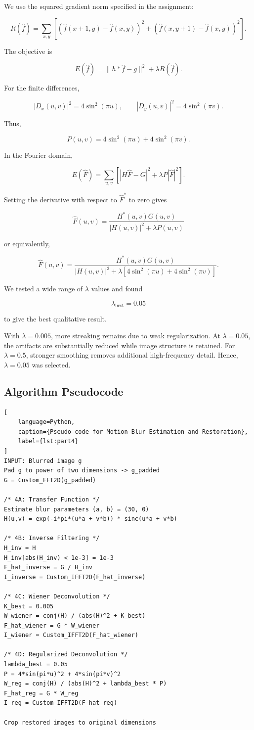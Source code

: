 \documentclass[11pt,a4paper]{article}
\begin{document}
We use the squared gradient norm specified in the assignment:

\[
R(\hat f)
=
\sum_{x,y}
\left[
(\hat f(x+1,y)-\hat f(x,y))^2+
(\hat f(x,y+1)-\hat f(x,y))^2
\right].
\]

The objective is

\[
E(\hat f)=\|h*\hat f-g\|^2+\lambda R(\hat f).
\]

For the finite differences,

\[
|D_x(u,v)|^2=4\sin^2(\pi u),
\qquad
|D_y(u,v)|^2=4\sin^2(\pi v).
\]

Thus,

\[
P(u,v)
=
4\sin^2(\pi u)+4\sin^2(\pi v).
\]

In the Fourier domain,

\[
E(\hat F)
=
\sum_{u,v}
\left[
|H\hat F-G|^2+
\lambda P|\hat F|^2
\right].
\]

Setting the derivative with respect to $\hat F^*$ to zero gives

\[
\boxed{
\hat F(u,v)
=
\frac{H^*(u,v)G(u,v)}
{|H(u,v)|^2+\lambda P(u,v)}
}
\]

or equivalently,

\[
\boxed{
\hat F(u,v)
=
\frac{H^*(u,v)G(u,v)}
{|H(u,v)|^2+
\lambda\left[
4\sin^2(\pi u)+4\sin^2(\pi v)
\right]}.
}
\]

We tested a wide range of $\lambda$ values and found

\[
\boxed{\lambda_{\mathrm{best}}=0.05}
\]

to give the best qualitative result.



With $\lambda=0.005$, more streaking remains due to weak regularization. At $\lambda=0.05$, the artifacts are substantially reduced while image structure is retained. For $\lambda=0.5$, stronger smoothing removes additional high-frequency detail. Hence, $\lambda=0.05$ was selected.

\subsection{Algorithm Pseudocode}
\begin{lstlisting}[
    language=Python,
    caption={Pseudo-code for Motion Blur Estimation and Restoration},
    label={lst:part4}
]
INPUT: Blurred image g
Pad g to power of two dimensions -> g_padded
G = Custom_FFT2D(g_padded)

/* 4A: Transfer Function */
Estimate blur parameters (a, b) = (30, 0)
H(u,v) = exp(-i*pi*(u*a + v*b)) * sinc(u*a + v*b)

/* 4B: Inverse Filtering */
H_inv = H
H_inv[abs(H_inv) < 1e-3] = 1e-3
F_hat_inverse = G / H_inv
I_inverse = Custom_IFFT2D(F_hat_inverse)

/* 4C: Wiener Deconvolution */
K_best = 0.005
W_wiener = conj(H) / (abs(H)^2 + K_best)
F_hat_wiener = G * W_wiener
I_wiener = Custom_IFFT2D(F_hat_wiener)

/* 4D: Regularized Deconvolution */
lambda_best = 0.05
P = 4*sin(pi*u)^2 + 4*sin(pi*v)^2
W_reg = conj(H) / (abs(H)^2 + lambda_best * P)
F_hat_reg = G * W_reg
I_reg = Custom_IFFT2D(F_hat_reg)

Crop restored images to original dimensions
\end{lstlisting}
\end{document}
